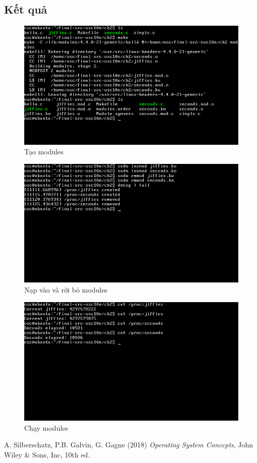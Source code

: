 \documentclass{article}
\begin{document}
\subsection{Kết quả} 
\begin{figure}[h]
    \centering
    \includegraphics[width=1\textwidth]{make.png}
    \caption{Tạo modules}
\end{figure}
\begin{figure}[h]
    \centering
    \includegraphics[width=1\textwidth]{load_remove.png}
    \caption{Nạp vào và rời bỏ modules}
\end{figure}
\begin{figure}[h]
    \centering
    \includegraphics[width=1\textwidth]{results.png}
    \caption{Chạy modules}
\end{figure}
\begin{thebibliography}{9}
    A. Silberschatz, P.B. Galvin, G. Gagne (2018) \emph{Operating System Concepts}, John Wiley \& Sons, Inc, 10th ed.

\end{thebibliography}
\end{document}
